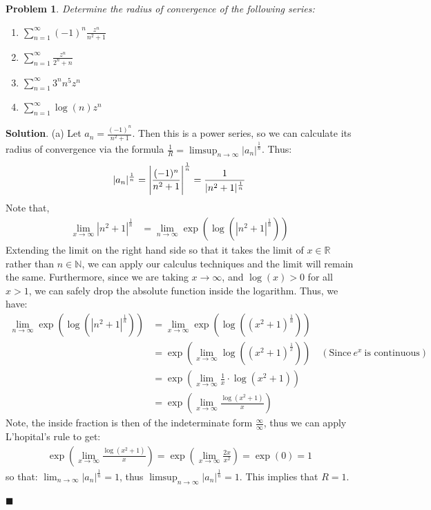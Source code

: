 \documentclass[12pt]{article}
\renewcommand{\=}[1]{\stackrel{#1}{=}} %
\providecommand{\RR}{\mathbb{R}}
\providecommand{\NN}{\mathbb{N}}
\newtheorem{p}{Problem}[section]
\theoremstyle{definition}
\newenvironment{s}{%
        \begin{trivlist} \item \textbf{Solution}. }{%
            \hspace*{\fill} $\blacksquare$\end{trivlist}}%
\begin{document}
\begin{p}
    Determine the radius of convergence of the following series:
    \begin{enumerate}
        \item $\sum_{n=1}^{\infty} (-1)^n\frac{z^n}{n^2+1}$
        \item $\sum_{n=1}^{\infty} \frac{z^n}{2^n+n}$
        \item $\sum_{n=1}^{\infty} 3^nn^5z^n$
        \item $\sum_{n=1}^{\infty} \log(n)z^n$
    \end{enumerate}
\end{p}
\begin{s}
    (a) Let $a_n = \frac{(-1)^n}{n^2+1}$. Then this is a power series, so we can calculate its radius of convergence via
    the formula $\frac{1}{R} = \limsup_{n\to\infty}|a_n|^{\frac{1}{n}}$. Thus:
    \begin{align*}
        |a_n|^{\frac{1}{n}} = \Bigg{|}\frac{(-1)^n}{n^2+1}\Bigg{|}^{\frac{1}{n}} = \frac{1}{|n^2+1|^{\frac{1}{n}}}
    \end{align*}
    Note that,
    \begin{align*}
        \lim_{x\to\infty} |n^2+1|^{\frac{1}{n}} &= \lim_{n\to\infty} \exp(\log(|n^2+1|^{\frac{1}{n}})) 
    \end{align*}
    Extending the limit on the right hand side so that it takes the limit of $x\in\RR$ rather than $n\in\NN$, we can apply
    our calculus techniques and the limit will remain the same. Furthermore, since we are taking $x\to\infty$, and 
    $\log(x) > 0$ for all $x > 1$, we can safely drop the absolute function inside the logarithm. Thus, we have:
    \begin{align*}
        \lim_{n\to\infty} \exp(\log(|n^2+1|^{\frac{1}{n}})) &= \lim_{x\to\infty} \exp(\log((x^2+1)^{\frac{1}{n}})) \\
        &= \exp(\lim_{x\to\infty}\log((x^2+1)^{\frac{1}{x}}))\quad(\text{Since}\:e^x\:\text{is continuous}) \\
        &= \exp(\lim_{x\to\infty}\frac{1}{x}\cdot\log(x^2+1)) \\
        &= \exp(\lim_{x\to\infty}\frac{\log(x^2+1)}{x})
    \end{align*}
    Note, the inside fraction is then of the indeterminate form $\frac{\infty}{\infty}$, thus we can apply L'hopital's rule
    to get:
    \begin{align*}
        \exp(\lim_{x\to\infty}\frac{\log(x^2+1)}{x}) = \exp(\lim_{x\to\infty}\frac{2x}{x^2}) = \exp(0) = 1
    \end{align*}
    so that: $\lim_{n\to\infty} |a_n|^{\frac{1}{n}} = 1$, thus $\limsup_{n\to\infty} |a_n|^{\frac{1}{n}} = 1$. This implies
    that $R = 1$. \\ \\


\end{s}
\end{document}
